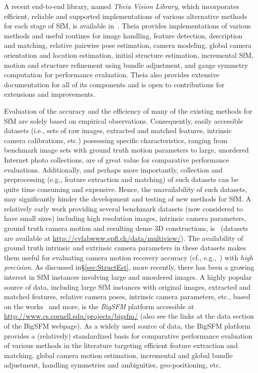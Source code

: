 \documentclass[10pt]{article}
\begin{document}
A recent end-to-end library, named \textit{Theia Vision Library}, which incorporates efficient, reliable and supported implementations of various alternative methods for each stage of SfM, is available in~\cite{Theia}. Theia provides implementations of various methods and useful routines for image handling, feature detection, description and matching, relative pairwise pose estimation, camera modeling, global camera orientation and location estimation, initial structure estimation, incremental SfM, motion and structure refinement using bundle adjustment, and gauge symmetry computation for performance evaluation. Theia also provides extensive documentation for all of its components and is open to contributions for extensions and improvements. 

Evaluation of the accuracy and the efficiency of many of the existing methods for SfM are solely based on empirical observations. Consequently, easily accessible datasets (i.e., sets of raw images, extracted and matched features, intrinsic camera calibrations, etc.) possessing specific characteristics, ranging from benchmark image sets with ground truth motion parameters to large, unordered Internet photo collections, are of great value for comparative performance evaluations. Additionally, and perhaps more importantly, collection and preprocessing (e.g., feature extraction and matching) of such datasets can be quite time consuming and expensive. Hence, the unavailability of such datasets, may significantly hinder the development and testing of new methods for SfM. A relatively early work providing several benchmark datasets (now considered to have small sizes) including high resolution images, intrinsic camera parameters, ground truth camera motion and resulting dense $3$D constructions, is~\cite{FountainData} (datasets are available at \url{http://cvlabwww.epfl.ch/data/multiview/}). The availability of ground truth intrinsic and extrinsic camera parameters in these datasets makes them useful for evaluating camera motion recovery accuracy (cf., e.g.,~\cite{MicaAmitSfM,CvXSfM}) with \textit{high precision}. As discussed in\S\ref{sec:StructEst}, more recently, there has been a growing interest in SfM instances involving large and unordered images. A highly popular source of data, including large SfM instances with original images, extracted and matched features, relative camera poses, intrinsic camera parameters, etc., based on the works~\cite{SnavelyBALarge,SnavelyRome,SnavelyData,WilsonSnavelyDisambig,Snavely1D} and more, is the \textit{BigSFM} platform accessible at \url{http://www.cs.cornell.edu/projects/bigsfm/} (also see the links at the data section of the BigSFM webpage). As a widely used source of data, the BigSFM platform provides a (relatively) standardized basis for comparative performance evaluation of various methods in the literature targeting efficient feature extraction and matching, global camera motion estimation, incremental and global bundle adjustment, handling symmetries and ambiguities, geo-positioning, etc.
\end{document}
